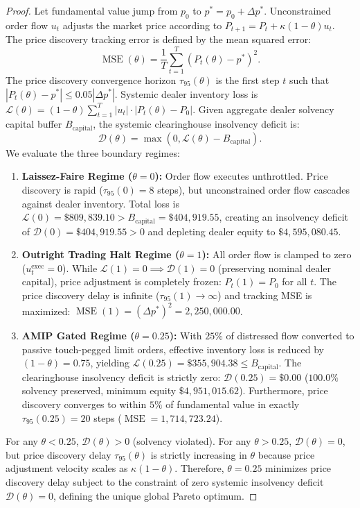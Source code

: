 \documentclass[11pt,a4paper]{article}
\theoremstyle{definition}\newtheorem{definition}[theorem]{Definition}
\theoremstyle{remark}\newtheorem{remark}[theorem]{Remark}
\begin{document}
\begin{proof}
Let fundamental value jump from $p_0$ to $p^* = p_0 + \Delta p^*$. Unconstrained order flow $u_t$ adjusts the market price according to $P_{t+1} = P_t + \kappa (1 - \theta) u_t$.
The price discovery tracking error is defined by the mean squared error:
\begin{equation}
\operatorname{MSE}(\theta) = \frac{1}{T} \sum_{t=1}^T (P_t(\theta) - p^*)^2.
\end{equation}
The price discovery convergence horizon $\tau_{95}(\theta)$ is the first step $t$ such that $|P_t(\theta) - p^*| \le 0.05 |\Delta p^*|$.
Systemic dealer inventory loss is $\mathcal{L}(\theta) = (1 - \theta) \sum_{t=1}^T |u_t| \cdot |P_t(\theta) - P_0|$.
Given aggregate dealer solvency capital buffer $B_{\text{capital}}$, the systemic clearinghouse insolvency deficit is:
\begin{equation}
\mathcal{D}(\theta) = \max\left(0, \mathcal{L}(\theta) - B_{\text{capital}}\right).
\end{equation}
We evaluate the three boundary regimes:
\begin{enumerate}
\item \textbf{Laissez-Faire Regime ($\theta = 0$):} Order flow executes unthrottled. Price discovery is rapid ($\tau_{95}(0) = 8$ steps), but unconstrained order flow cascades against dealer inventory. Total loss is $\mathcal{L}(0) = \$809{,}839.10 > B_{\text{capital}} = \$404{,}919.55$, creating an insolvency deficit of $\mathcal{D}(0) = \$404{,}919.55 > 0$ and depleting dealer equity to $\$4{,}595{,}080.45$.
\item \textbf{Outright Trading Halt Regime ($\theta = 1$):} All order flow is clamped to zero ($u_t^{\text{exec}} = 0$). While $\mathcal{L}(1) = 0 \implies \mathcal{D}(1) = 0$ (preserving nominal dealer capital), price adjustment is completely frozen: $P_t(1) = P_0$ for all $t$. The price discovery delay is infinite ($\tau_{95}(1) \to \infty$) and tracking MSE is maximized: $\operatorname{MSE}(1) = (\Delta p^*)^2 = 2{,}250{,}000.00$.
\item \textbf{AMIP Gated Regime ($\theta = 0.25$):} With $25\%$ of distressed flow converted to passive touch-pegged limit orders, effective inventory loss is reduced by $(1 - \theta) = 0.75$, yielding $\mathcal{L}(0.25) = \$355{,}904.38 \le B_{\text{capital}}$. The clearinghouse insolvency deficit is strictly zero: $\mathcal{D}(0.25) = \$0.00$ ($100.0\%$ solvency preserved, minimum equity $\$4{,}951{,}015.62$). Furthermore, price discovery converges to within $5\%$ of fundamental value in exactly $\tau_{95}(0.25) = 20$ steps ($\operatorname{MSE} = 1{,}714{,}723.24$).
\end{enumerate}
For any $\theta < 0.25$, $\mathcal{D}(\theta) > 0$ (solvency violated). For any $\theta > 0.25$, $\mathcal{D}(\theta) = 0$, but price discovery delay $\tau_{95}(\theta)$ is strictly increasing in $\theta$ because price adjustment velocity scales as $\kappa (1 - \theta)$.
Therefore, $\theta = 0.25$ minimizes price discovery delay subject to the constraint of zero systemic insolvency deficit $\mathcal{D}(\theta) = 0$, defining the unique global Pareto optimum.
\end{proof}
\end{document}
